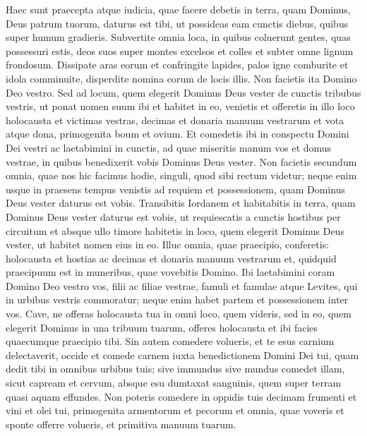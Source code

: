 \begin{biblechapter} 
\verse Haec sunt praecepta atque iudicia, quae facere debetis in terra, quam Dominus, Deus patrum tuorum, daturus est tibi, ut possideas eam cunctis diebus, quibus super humum gradieris. 
\verse Subvertite omnia loca, in quibus coluerunt gentes, quas possessuri estis, deos suos super montes excelsos et colles et subter omne lignum frondosum. 
\verse Dissipate aras eorum et confringite lapides, palos igne comburite et idola comminuite, disperdite nomina eorum de locis illis. 
\verse Non facietis ita Domino Deo vestro. 
\verse Sed ad locum, quem elegerit Dominus Deus vester de cunctis tribubus vestris, ut ponat nomen suum ibi et habitet in eo, venietis 
\verse et offeretis in illo loco holocausta et victimas vestras, decimas et donaria manuum vestrarum et vota atque dona, primogenita boum et ovium. 
\verse Et comedetis ibi in conspectu Domini Dei vestri ac laetabimini in cunctis, ad quae miseritis manum vos et domus vestrae, in quibus benedixerit vobis Dominus Deus vester. 
\verse Non facietis secundum omnia, quae nos hic facimus hodie, singuli, quod sibi rectum videtur; 
\verse neque enim usque in praesens tempus venistis ad requiem et possessionem, quam Dominus Deus vester daturus est vobis. 
\verse Transibitis Iordanem et habitabitis in terra, quam Dominus Deus vester daturus est vobis, ut requiescatis a cunctis hostibus per circuitum et absque ullo timore habitetis  
\verse in loco, quem elegerit Dominus Deus vester, ut habitet nomen eius in eo. Illuc omnia, quae praecipio, conferetis: holocausta et hostias ac decimas et donaria manuum vestrarum et, quidquid praecipuum est in muneribus, quae vovebitis Domino. 
\verse Ibi laetabimini coram Domino Deo vestro vos, filii ac filiae vestrae, famuli et famulae atque Levites, qui in urbibus vestris commoratur; neque enim habet partem et possessionem inter vos. 
\verse Cave, ne offeras holocausta tua in omni loco, quem videris, 
\verse sed in eo, quem elegerit Dominus in una tribuum tuarum, offeres holocausta et ibi facies quaecumque praecipio tibi. 
\verse Sin autem comedere volueris, et te esus carnium delectaverit, occide et comede carnem iuxta benedictionem Domini Dei tui, quam dedit tibi in omnibus urbibus tuis; sive immundus sive mundus comedet illam, sicut capream et cervum, 
\verse absque esu dumtaxat sanguinis, quem super terram quasi aquam effundes. 
\verse Non poteris comedere in oppidis tuis decimam frumenti et vini et olei tui, primogenita armentorum et pecorum et omnia, quae voveris et sponte offerre volueris, et primitiva manuum tuarum. 

\end{biblechapter}
